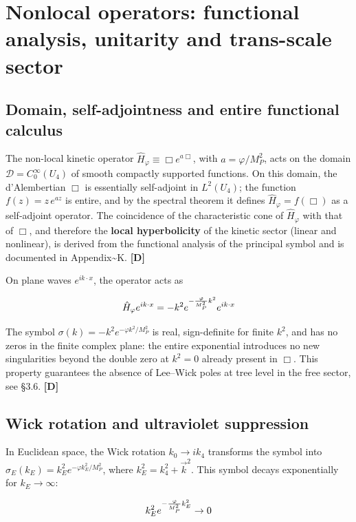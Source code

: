 ﻿\documentclass[11pt,letterpaper]{article}
\begin{document}
\section{Nonlocal operators: functional analysis, unitarity and trans-scale sector}
\subsection{Domain, self-adjointness and entire functional calculus}
The non-local kinetic operator $\hat{H}_\varphi \equiv \Box e^{a\Box}$, with $a = \varphi/M_P^2$, acts on the domain $\mathcal{D} = C_0^\infty(U_4)$ of smooth compactly supported functions. On this domain, the d'Alembertian $\Box$ is essentially self-adjoint in $L^2(U_4)$; the function $f(z) = z\,e^{az}$ is entire, and by the spectral theorem it defines $\hat{H}_\varphi = f(\Box)$ as a self-adjoint operator. The coincidence of the characteristic cone of $\hat{H}_\varphi$ with that of $\Box$, and therefore the \textbf{local hyperbolicity} of the kinetic sector (linear and nonlinear), is derived from the functional analysis of the principal symbol and is documented in Appendix\textasciitilde{}K. \textbf{[D]}

On plane waves $e^{ik\cdot x}$, the operator acts as

\begin{equation*}
  \resizebox{\ifdim\width>\linewidth \linewidth\else\width\fi}{!}{$\displaystyle \hat{H}_\varphi e^{ik\cdot x} = -k^2 e^{-\frac{\varphi}{M_P^2}k^2}e^{ik\cdot x}$}
\end{equation*}

The symbol $\sigma(k) = -k^2 e^{-\varphi k^2/M_P^2}$ is real, sign-definite for finite $k^2$, and has no zeros in the finite complex plane: the entire exponential introduces no new singularities beyond the double zero at $k^2 = 0$ already present in $\Box$. This property guarantees the absence of Lee--Wick poles at tree level in the free sector, see §3.6. \textbf{[D]}
\subsection{Wick rotation and ultraviolet suppression}
In Euclidean space, the Wick rotation $k_0 \to i k_4$ transforms the symbol into $\sigma_E(k_E) = k_E^2 e^{-\varphi k_E^2/M_P^2}$, where $k_E^2 = k_4^2 + \vec{k}^2$. This symbol decays exponentially for $k_E \to \infty$:

\begin{equation*}
  \resizebox{\ifdim\width>\linewidth \linewidth\else\width\fi}{!}{$\displaystyle k_E^2 e^{-\frac{\varphi}{M_P^2}k_E^2} \to 0$}
\end{equation*}
\end{document}
